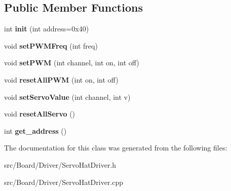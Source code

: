 \subsection*{Public Member Functions}
\begin{DoxyCompactItemize}
\item 
\mbox{\label{classServoHatDriver_acd55eaaae4fe72f8ed7c899c3e332a0f}} 
int {\bfseries init} (int address=0x40)
\item 
\mbox{\label{classServoHatDriver_a3f9a5961dedde7a4bbde8254a4dfdf59}} 
void {\bfseries set\+P\+W\+M\+Freq} (int freq)
\item 
\mbox{\label{classServoHatDriver_a666c0cf7beee25d381e0f5d3cfd23491}} 
void {\bfseries set\+P\+WM} (int channel, int on, int off)
\item 
\mbox{\label{classServoHatDriver_af784ccc448ddc82a152f238c25f59b46}} 
void {\bfseries reset\+All\+P\+WM} (int on, int off)
\item 
\mbox{\label{classServoHatDriver_a742ae6e5f99b08f017084c4053b95147}} 
void {\bfseries set\+Servo\+Value} (int channel, int v)
\item 
\mbox{\label{classServoHatDriver_a3c80c94e0390d58c97d5e35787c1798f}} 
void {\bfseries reset\+All\+Servo} ()
\item 
\mbox{\label{classServoHatDriver_a6ef84bcafbc36d250467b30e4b656257}} 
int {\bfseries get\+\_\+address} ()
\end{DoxyCompactItemize}


The documentation for this class was generated from the following files\+:\begin{DoxyCompactItemize}
\item 
src/\+Board/\+Driver/Servo\+Hat\+Driver.\+h\item 
src/\+Board/\+Driver/Servo\+Hat\+Driver.\+cpp\end{DoxyCompactItemize}
